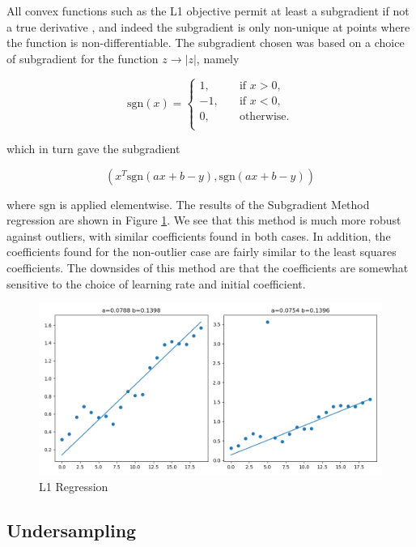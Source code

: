 \documentclass[12pt]{article}
\begin{document}
All convex functions such as the L1 objective permit at least a subgradient if not a true derivative \cite{convex},
and indeed the subgradient is only non-unique at points where the function is non-differentiable.
The subgradient chosen was based on a choice of subgradient for the function $z\rightarrow|z|$,
namely

\[
\text{sgn}(x) =
\begin{cases}
    1,   &\quad\text{if }x>0,\\
    -1,  &\quad\text{if }x<0,\\
    0,   &\quad\text{otherwise.}\\
\end{cases}
\]

which in turn gave the subgradient

\[(x^T\text{sgn}(ax+b-y), \text{sgn}(ax+b-y))\]

where $\text{sgn}$ is applied elementwise.
The results of the Subgradient Method regression are shown in Figure \ref{fig:regression_l1}.
We see that this method is much more robust against outliers, with similar coefficients found in both cases.
In addition, the coefficients found for the non-outlier case are fairly similar to the least squares coefficients.
The downsides of this method are that the coefficients are somewhat sensitive to the choice of learning rate and initial coefficient.

\begin{figure}[hp]
    \includegraphics[scale=0.5]{figures/regression_l1.png}
    \caption{L1 Regression}
    \label{fig:regression_l1}
\end{figure}

\subsection{Undersampling}
\end{document}
